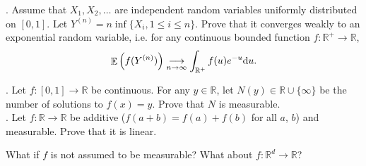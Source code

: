 \documentclass[11pt,reqno]{amsart}
\newcommand{\RR}{{\mathbb R}}
\DeclareMathOperator{\E}{\mathbb{E}}      %
\theoremstyle{definition}
\theoremstyle{remark}
\newcommand{\1}{\mathds{1}}
\numberwithin{equation}{section}
\begin{document}
. Assume that $X_1,X_2,\dots$ are independent random variables uniformly distributed on $[0,1]$.
Let $Y^{(n)}=n \inf\{X_i,1\leq i\leq n\}$. Prove that it converges weakly to an exponential random variable, i.e.
for any continuous bounded function $f:\RR^+\to\RR$,
$$
\E\left(f(Y^{(n)})\right)\underset{n\to\infty}{\longrightarrow}\int_{\RR^+}f(u)e^{-u}{\rm d} u.
$$

.  Let $f:[0,1]\to\mathbb{R}$ be continuous.  For any $y\in\mathbb{R}$, let $N(y)\in\mathbb{R}\cup\{\infty\}$ be the number of solutions to $f(x)=y$. Prove that $N$ is measurable. \\

.  Let $f:\mathbb{R}\to\mathbb{R}$ be additive ($f(a+b)=f(a)+f(b)$ for all $a$, $b$) and measurable.  Prove that it is  linear.

What if $f$ is not assumed to be measurable? What about $f:\mathbb{R}^d\to\mathbb{R}$?
\end{document}
